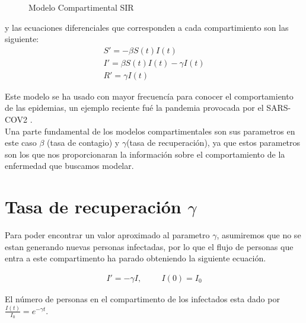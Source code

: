 \begin{figure}[h]
\centering
{}
\caption{Modelo Compartimental SIR} \label{fig:Compartimento SIR}
\end{figure}	

y las ecuaciones diferenciales que corresponden a cada compartimiento son las siguiente: 
\begin{align}
S' = -\beta S\left(t\right)I\left(t\right)\\			
I' = \beta S\left(t\right)I\left(t\right) - \gamma I\left(t\right)\\		
R' = \gamma I\left(t\right)
\end{align}

Este modelo se ha usado con mayor frecuencía para conocer el comportamiento de las epidemias, un ejemplo reciente fué la pandemia provocada por el SARS-COV2 \cite{Martcheva}.\\

Una parte fundamental de los modelos compartimentales son sus parametros en este caso $\beta$ (tasa de contagio) y $\gamma$(tasa de recuperación), ya que estos parametros son los que nos proporcionaran la información sobre el comportamiento de la enfermedad que buscamos modelar.\\

\section{Tasa de recuperación \textbf{$\gamma$}}

Para poder encontrar un valor aproximado al parametro $\gamma$, asumiremos que no se estan generando nuevas personas infectadas, por lo que el flujo de personas que entra a este compartimento ha parado obteniendo la siguiente ecuación.

\begin{align}
I' = -\gamma I, \hspace{1cm} I(0) = I_{0}
\end{align}

\begin{Af}
El número de personas en el compartimento de los infectados esta dado por $\frac{I(t)}{I_{0}} = e^{-\gamma t}$.
\end{Af}


